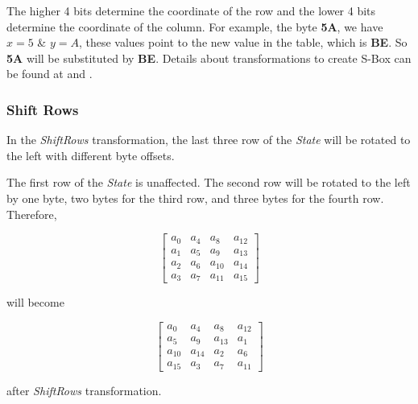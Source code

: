 \documentclass[a4paper, 10pt]{article}
\begin{document}
\begin{multicols}{2}
            The higher 4 bits determine the coordinate of the row and the lower 4 bits determine the coordinate of the column. For example, the byte \textbf{5A}, we have $x=5$ \& $y=A$, these values point to the new value in the table, which is \textbf{BE}. So \textbf{5A} will be substituted by \textbf{BE}. Details about transformations to create S-Box can be found at \cite{AES} and \cite{sam-s-box}.

            \subsubsection{Shift Rows}
            \label{sec:shift-rows-intro}

            In the \textit{ShiftRows} transformation, the last three row of the \textit{State} will be rotated to the left with different byte offsets.

            The first row of the \textit{State} is unaffected. The second row will be rotated to the left by one byte, two bytes for the third row, and three bytes for the fourth row. Therefore,

            \begin{equation}
                \begin{bmatrix}
                    a_{0} & a_{4} & a_{8} & a_{12}\\
                    a_{1} & a_{5} & a_{9} & a_{13}\\
                    a_{2} & a_{6} & a_{10} & a_{14}\\
                    a_{3} & a_{7} & a_{11} & a_{15}
                \end{bmatrix}
                \label{equ:shift-rows-example}
            \end{equation}

            will become

            \begin{equation}
                \begin{bmatrix}
                    a_{0} & a_{4} & a_{8} & a_{12}\\
                    a_{5} & a_{9} & a_{13} & a_{1}\\
                    a_{10} & a_{14} & a_{2} & a_{6}\\
                    a_{15} & a_{3} & a_{7} & a_{11}
                \end{bmatrix}
            \end{equation}

            after \textit{ShiftRows} transformation.


\end{multicols}
\end{document}
